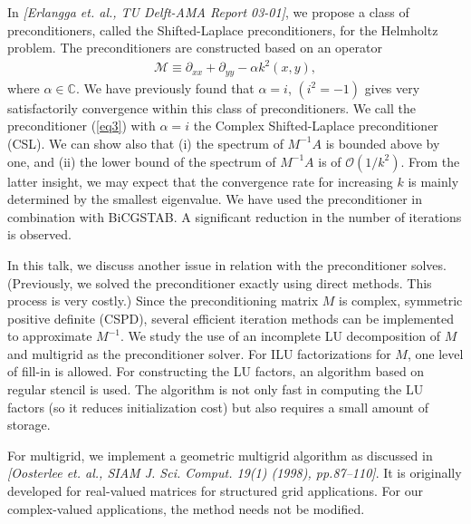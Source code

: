\documentclass{report}
\begin{document}
In {\it [Erlangga et. al., TU Delft-AMA Report 03-01]}, we propose a
class of preconditioners, called the Shifted-Laplace preconditioners, for
the Helmholtz problem. The preconditioners are constructed based on an
operator
\begin{eqnarray}
\mathcal{M} \equiv \partial_{xx} + \partial_{yy} - \alpha k^2(x,y), \label{eq3}
\end{eqnarray}
where $\alpha \in \mathbb{C}$. We have previously found that $\alpha =
i$, $(i^2 = -1)$ gives very satisfactorily convergence within this class
of preconditioners. We call the preconditioner (\ref{eq3}) with $\alpha =
i$ the Complex Shifted-Laplace preconditioner (CSL). We can show also
that (i) the spectrum of $M^{-1}A$ is bounded above by one, and (ii) the
lower bound of the spectrum of $M^{-1}A$ is of $\mathcal{O}(1/k^2)$. From
the latter insight, we may expect that the convergence rate for
increasing $k$ is mainly determined by the smallest eigenvalue. We have
used the preconditioner in combination with BiCGSTAB. A significant
reduction in the number of iterations is observed.

In this talk, we discuss another issue in relation with the
preconditioner solves. (Previously, we solved the preconditioner exactly
using direct methods. This process is very costly.) Since the
preconditioning matrix $M$ is complex, symmetric positive definite
(CSPD), several efficient iteration methods can be implemented to
approximate $M^{-1}$. We study the use of an incomplete LU decomposition
of $M$ and multigrid as the preconditioner solver. For ILU factorizations
for $M$, one level of fill-in is allowed. For constructing the LU
factors, an algorithm based on regular stencil is used. The algorithm is
not only fast in computing the LU factors (so it reduces initialization
cost) but also requires a small amount of storage.

For multigrid, we implement a geometric multigrid algorithm as discussed
in {\it [Oosterlee et. al., SIAM J. Sci. Comput. 19(1) (1998),
pp.87--110]}. It is originally developed for real-valued matrices for
structured grid applications. For our complex-valued applications, the
method needs not be modified.
\end{document}
